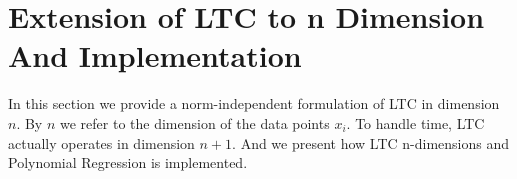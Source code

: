 \chapter{Extension of LTC to n Dimension And Implementation}

In this section we provide a norm-independent formulation of LTC in dimension
$n$. By $n$ we refer to the dimension of the data points $x_i$. To handle time,
LTC actually operates in dimension $n+1$. And we present how LTC n-dimensions
and Polynomial Regression is implemented.





